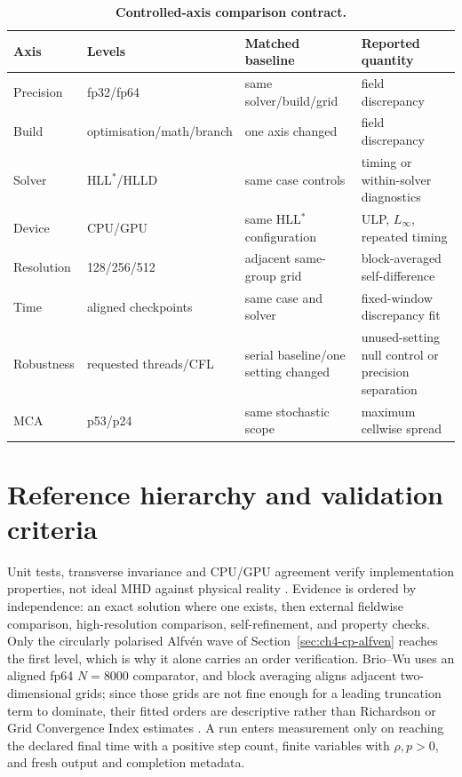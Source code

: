 \begin{table}[htbp]
\centering
\small
\begin{tabularx}{\textwidth}{@{}lllX@{}}
\toprule
Axis & Levels & Matched baseline & Reported quantity \\
\midrule
Precision & fp32/fp64 & same solver/build/grid & field discrepancy \\
Build & optimisation/math/branch & one axis changed & field discrepancy \\
Solver & HLL$^{\ast}$/HLLD & same case controls & timing or within-solver diagnostics \\
Device & CPU/GPU & same HLL$^{\ast}$ configuration & ULP, $L_\infty$, repeated timing \\
Resolution & 128/256/512 & adjacent same-group grid & block-averaged self-difference \\
Time & aligned checkpoints & same case and solver & fixed-window discrepancy fit \\
Robustness & requested threads/CFL & serial baseline/one setting changed & unused-setting null control or precision separation \\
MCA & p53/p24 & same stochastic scope & maximum cellwise spread \\
\bottomrule
\end{tabularx}
\caption[Controlled-axis comparison contract]{\textbf{Controlled-axis
comparison contract.}}
\label{tab:ch3-axis-matrix}
\end{table}

\section{Reference hierarchy and validation criteria}
\label{sec:ch3-reference-hierarchy}

Unit tests, transverse invariance and CPU/GPU agreement verify implementation
properties, not ideal MHD against physical reality
\citep{oberkampfRoy2010vv}. Evidence is ordered by independence: an exact
solution where one exists, then external fieldwise comparison,
high-resolution comparison, self-refinement, and property checks. Only the
circularly polarised Alfv\'en wave of Section~\ref{sec:ch4-cp-alfven} reaches
the first level, which is why it alone carries an order verification. Brio--Wu
uses an aligned fp64 $N=8000$ comparator, and block averaging aligns adjacent
two-dimensional grids; since those grids are not fine enough for a leading
truncation term to dominate, their fitted orders are descriptive rather than
Richardson or Grid Convergence Index estimates \citep{roache1994gci}.
A run enters measurement only on reaching the declared final time with a
positive step count, finite variables with $\rho,p>0$, and fresh output and
completion metadata.

